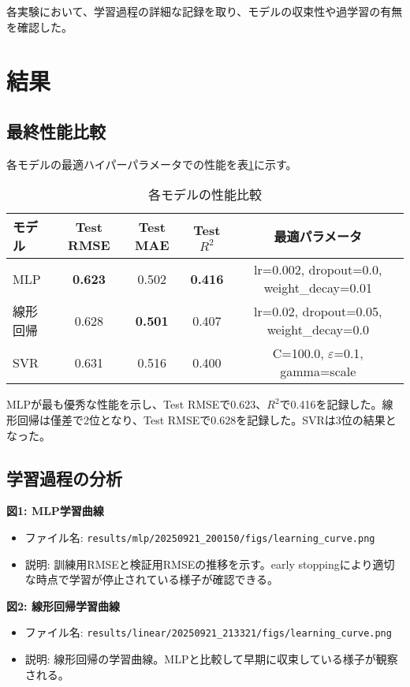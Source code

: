 \documentclass[12pt,a4paper,dvipdfmx]{jsarticle}
\begin{document}
各実験において、学習過程の詳細な記録を取り、モデルの収束性や過学習の有無を確認した。

\section{結果}

\subsection{最終性能比較}

各モデルの最適ハイパーパラメータでの性能を表\ref{tab:performance}に示す。

\begin{table}[h]
\centering
\caption{各モデルの性能比較}
\label{tab:performance}
\begin{tabular}{lcccc}
\toprule
モデル & Test RMSE & Test MAE & Test $R^2$ & 最適パラメータ \\
\midrule
MLP & \textbf{0.623} & 0.502 & \textbf{0.416} & lr=0.002, dropout=0.0, weight\_decay=0.01 \\
線形回帰 & 0.628 & \textbf{0.501} & 0.407 & lr=0.02, dropout=0.05, weight\_decay=0.0 \\
SVR & 0.631 & 0.516 & 0.400 & C=100.0, $\varepsilon$=0.1, gamma=scale \\
\bottomrule
\end{tabular}
\end{table}

MLPが最も優秀な性能を示し、Test RMSEで0.623、$R^2$で0.416を記録した。線形回帰は僅差で2位となり、Test RMSEで0.628を記録した。SVRは3位の結果となった。

\subsection{学習過程の分析}

\textbf{図1: MLP学習曲線}
\begin{itemize}
    \item ファイル名: \texttt{results/mlp/20250921\_200150/figs/learning\_curve.png}
    \item 説明: 訓練用RMSEと検証用RMSEの推移を示す。early stoppingにより適切な時点で学習が停止されている様子が確認できる。
\end{itemize}

\textbf{図2: 線形回帰学習曲線}
\begin{itemize}
    \item ファイル名: \texttt{results/linear/20250921\_213321/figs/learning\_curve.png}
    \item 説明: 線形回帰の学習曲線。MLPと比較して早期に収束している様子が観察される。
\end{itemize}
\end{document}
